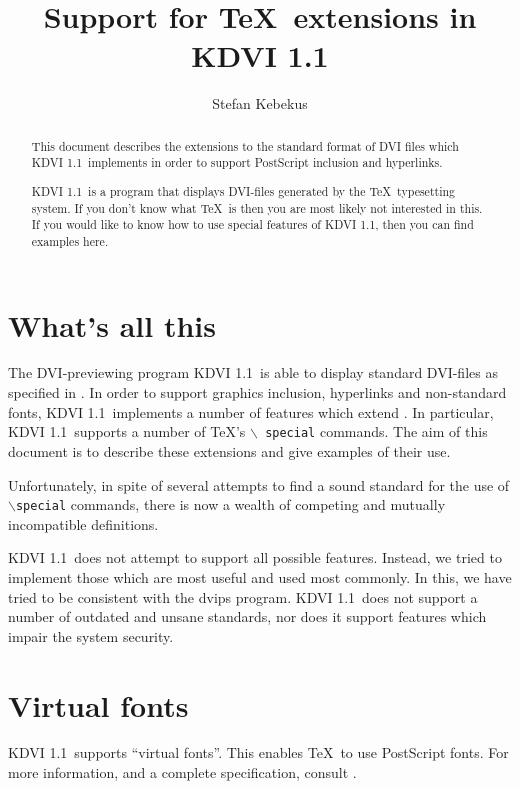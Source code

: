 \documentclass{article}
\newcommand{\KDVI}{{\sf KDVI 1.1}}
\begin{document}
\title{Support for \TeX\ extensions in \KDVI}

\author{Stefan Kebekus}

\maketitle
\begin{abstract}
  This document describes the extensions to the standard format of DVI
  files which \KDVI\ implements in order to support PostScript
  inclusion and hyperlinks.
  
  \KDVI\ is a program that displays DVI-files generated by the \TeX\ 
  typesetting system. If you don't know what \TeX\ is then you are
  most likely not interested in this. If you would like to know how to
  use special features of \KDVI, then you can find examples here.
\end{abstract}

\tableofcontents

\section{What's all this}

The DVI-previewing program \KDVI\ is able to display standard
DVI-files as specified in \cite{Level0Std}. In order to support
graphics inclusion, hyperlinks and non-standard fonts, \KDVI\ 
implements a number of features which extend \cite{Level0Std}. In
particular, \KDVI\ supports a number of \TeX 's $\backslash${\tt
  special} commands. The aim of this document is to describe these
extensions and give examples of their use.

Unfortunately, in spite of several attempts to find a sound standard
for the use of $\backslash${\tt special} commands, there is now a
wealth of competing and mutually incompatible definitions.

\KDVI\ does not attempt to support all possible features. Instead, we
tried to implement those which are most useful and used most commonly.
In this, we have tried to be consistent with the {\sf dvips} program.
\KDVI\ does not support a number of outdated and unsane standards, nor
does it support features which impair the system security.


\section{Virtual fonts}

\KDVI\ supports ``virtual fonts''. This enables \TeX\ to use
PostScript fonts. For more information, and a complete specification,
consult \cite{dvips}.
\end{document}
